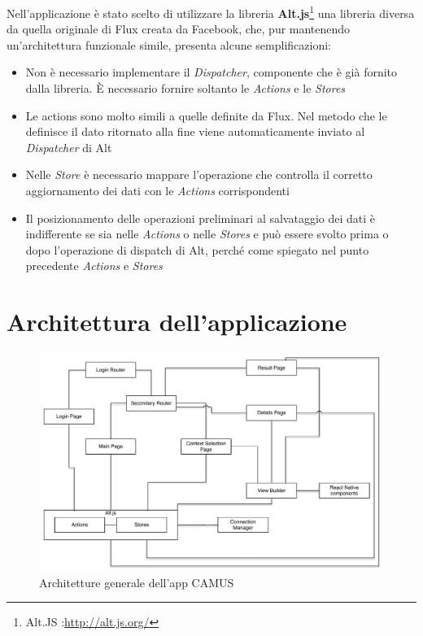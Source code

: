 Nell'applicazione è stato scelto di utilizzare la libreria \textbf{Alt.js}\footnote{Alt.JS :\url{http://alt.js.org/}} una libreria diversa da quella originale di Flux creata da Facebook, che, pur mantenendo un'architettura funzionale simile, presenta alcune semplificazioni:
	\begin{itemize}
		\item Non è necessario implementare il \emph{Dispatcher}, componente che è già fornito dalla libreria. È necessario fornire soltanto le \emph{Actions}  e le \emph{Stores}
		\item Le actions sono molto simili a quelle definite da Flux. Nel metodo che le definisce il dato ritornato alla fine viene automaticamente inviato al \emph{Dispatcher} di Alt
		\item Nelle \emph{Store} è necessario mappare l'operazione che controlla il corretto aggiornamento dei dati con le \emph{Actions} corrispondenti
		\item Il posizionamento delle operazioni preliminari al salvataggio dei dati è indifferente se sia nelle \emph{Actions} o nelle \emph{Stores} e può essere svolto prima o dopo l'operazione di dispatch di Alt, perché come spiegato nel punto precedente \emph{Actions} e \emph{Stores}
	\end{itemize}

\section {Architettura dell'applicazione}\label{sec:architettura-applicazione}

\begin{figure}[ht]
	\centering
	\includegraphics[width=\textwidth]{6-implementazione-app/immagini/app_architecture.pdf}
	\caption{Architetture generale dell'app CAMUS}\label{fig:app-architecture}
\end{figure}


